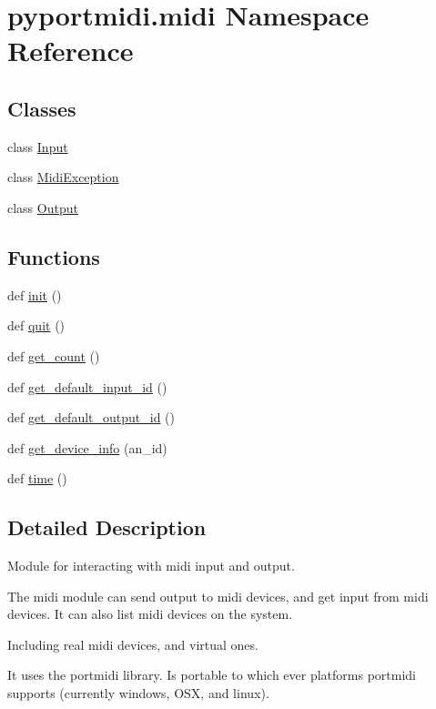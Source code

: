 \hypertarget{namespacepyportmidi_1_1midi}{}\section{pyportmidi.\+midi Namespace Reference}
\label{namespacepyportmidi_1_1midi}
\subsection*{Classes}
\begin{DoxyCompactItemize}
\item 
class \hyperlink{classpyportmidi_1_1midi_1_1_input}{Input}
\item 
class \hyperlink{classpyportmidi_1_1midi_1_1_midi_exception}{Midi\+Exception}
\item 
class \hyperlink{classpyportmidi_1_1midi_1_1_output}{Output}
\end{DoxyCompactItemize}
\subsection*{Functions}
\begin{DoxyCompactItemize}
\item 
def \hyperlink{namespacepyportmidi_1_1midi_ae790448b43b32216ea49a4ea3a38d4f1}{init} ()
\item 
def \hyperlink{namespacepyportmidi_1_1midi_ab137af1a6f12f955b0b05c088097cebe}{quit} ()
\item 
def \hyperlink{namespacepyportmidi_1_1midi_aefe6f781e4c0438b7367ab38420b40fe}{get\+\_\+count} ()
\item 
def \hyperlink{namespacepyportmidi_1_1midi_a363659de2add2e70b2ff71c3ce1464a2}{get\+\_\+default\+\_\+input\+\_\+id} ()
\item 
def \hyperlink{namespacepyportmidi_1_1midi_a5fa5844528cd9e0960747caef3a49d72}{get\+\_\+default\+\_\+output\+\_\+id} ()
\item 
def \hyperlink{namespacepyportmidi_1_1midi_ae6999ebd102645244f4de1d46ed31875}{get\+\_\+device\+\_\+info} (an\+\_\+id)
\item 
def \hyperlink{namespacepyportmidi_1_1midi_ad2426758f88d23d7208984d5c99ec050}{time} ()
\end{DoxyCompactItemize}


\subsection{Detailed Description}
\begin{DoxyVerb}Module for interacting with midi input and output.

The midi module can send output to midi devices, and get input
from midi devices.  It can also list midi devices on the system.

Including real midi devices, and virtual ones.

It uses the portmidi library.  Is portable to which ever platforms
portmidi supports (currently windows, OSX, and linux).
\end{DoxyVerb}
 

